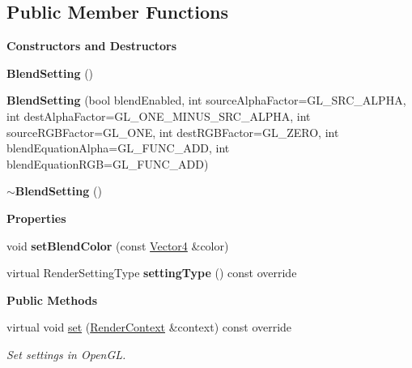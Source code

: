 \subsection*{Public Member Functions}
\begin{Indent}\textbf{ Constructors and Destructors}\par
\begin{DoxyCompactItemize}
\item 
\mbox{\label{classrev_1_1_blend_setting_ad9305a08cf93b3deec62c774ed97c2d9}} 
{\bfseries Blend\+Setting} ()
\item 
\mbox{\label{classrev_1_1_blend_setting_a3f43efedea13f3a8f6195a8fd9efa5bf}} 
{\bfseries Blend\+Setting} (bool blend\+Enabled, int source\+Alpha\+Factor=G\+L\+\_\+\+S\+R\+C\+\_\+\+A\+L\+P\+HA, int dest\+Alpha\+Factor=G\+L\+\_\+\+O\+N\+E\+\_\+\+M\+I\+N\+U\+S\+\_\+\+S\+R\+C\+\_\+\+A\+L\+P\+HA, int source\+R\+G\+B\+Factor=G\+L\+\_\+\+O\+NE, int dest\+R\+G\+B\+Factor=G\+L\+\_\+\+Z\+E\+RO, int blend\+Equation\+Alpha=G\+L\+\_\+\+F\+U\+N\+C\+\_\+\+A\+DD, int blend\+Equation\+R\+GB=G\+L\+\_\+\+F\+U\+N\+C\+\_\+\+A\+DD)
\item 
\mbox{\label{classrev_1_1_blend_setting_ab9646d1af35a669cf1b8643d66af087b}} 
{\bfseries $\sim$\+Blend\+Setting} ()
\end{DoxyCompactItemize}
\end{Indent}
\begin{Indent}\textbf{ Properties}\par
\begin{DoxyCompactItemize}
\item 
\mbox{\label{classrev_1_1_blend_setting_ad28d923f052c3a69f13c5e8102caaa16}} 
void {\bfseries set\+Blend\+Color} (const \mbox{\hyperlink{classrev_1_1_vector}{Vector4}} \&color)
\item 
\mbox{\label{classrev_1_1_blend_setting_ae40fd98d6258cbc744de8f5103e6c4eb}} 
virtual Render\+Setting\+Type {\bfseries setting\+Type} () const override
\end{DoxyCompactItemize}
\end{Indent}
\begin{Indent}\textbf{ Public Methods}\par
\begin{DoxyCompactItemize}
\item 
\mbox{\label{classrev_1_1_blend_setting_ad1d5eba7678c837c60db60f369e2018b}} 
virtual void \mbox{\hyperlink{classrev_1_1_blend_setting_ad1d5eba7678c837c60db60f369e2018b}{set}} (\mbox{\hyperlink{classrev_1_1_render_context}{Render\+Context}} \&context) const override
\begin{DoxyCompactList}\small\item\em Set settings in Open\+GL. \end{DoxyCompactList}\end{DoxyCompactItemize}
\end{Indent}
